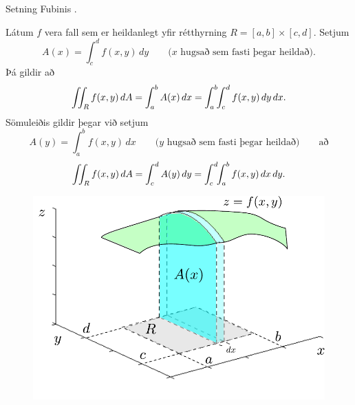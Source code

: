 \begin{frame}{} 

\begin {block}{Setning Fubinis \kaflanr.}

Látum $f$ vera fall sem er heildanlegt yfir rétthyrning $R=[a,b]\times
[c,d]$. Setjum
$$A(x)=\int_c^d f(x,y)\,dy\qquad\mbox{($x$ hugsað sem fasti þegar heildað)}.$$
Þá gildir að 
$$\int\!\!\!\int_R f(x,y)\,dA=\int_a^b A(x)\,dx=\int_a^b\!\!\int_c^d
f(x,y)\,dy\,dx.$$
Sömuleiðis gildir þegar við setjum 
$$A(y)=\int_a^b f(x,y)\,dx\qquad\mbox{($y$ hugsað sem fasti þegar heildað)} \qquad \text{að}$$
$$\int\!\!\!\int_R f(x,y)\,dA=\int_c^d A(y)\,dy=\int_c^d\!\!\int_a^b
f(x,y)\,dx\,dy.$$

\end{block}

\end{frame}
\begin {frame}
    \begin {figure}[h!]
 \centering
            \includegraphics[width=0.6\linewidth]{ax1}
            \caption*{}
\end {figure}
\end {frame}
